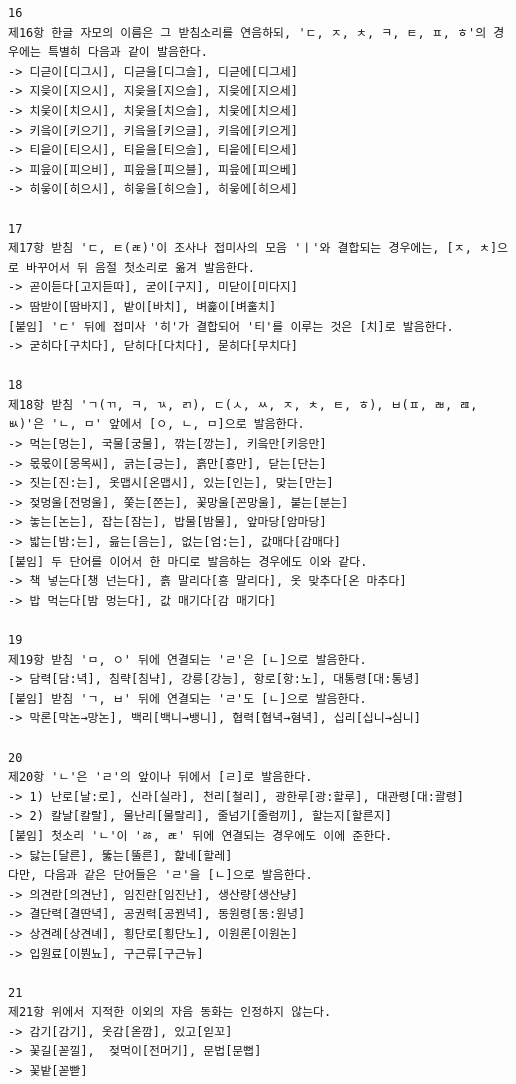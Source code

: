 \documentclass[letterpaper]{article} %
\begin{document}
\begin{verbatim}
16
제16항 한글 자모의 이름은 그 받침소리를 연음하되, 'ㄷ, ㅈ, ㅊ, ㅋ, ㅌ, ㅍ, ㅎ'의 경우에는 특별히 다음과 같이 발음한다.
-> 디귿이[디그시], 디귿을[디그슬], 디귿에[디그세]
-> 지읒이[지으시], 지읒을[지으슬], 지읒에[지으세]
-> 치읓이[치으시], 치읓을[치으슬], 치읓에[치으세]
-> 키읔이[키으기], 키읔을[키으글], 키읔에[키으게]
-> 티읕이[티으시], 티읕을[티으슬], 티읕에[티으세]
-> 피읖이[피으비], 피읖을[피으블], 피읖에[피으베]
-> 히읗이[히으시], 히읗을[히으슬], 히읗에[히으세]

17
제17항 받침 'ㄷ, ㅌ(ㄾ)'이 조사나 접미사의 모음 'ㅣ'와 결합되는 경우에는, [ㅈ, ㅊ]으로 바꾸어서 뒤 음절 첫소리로 옮겨 발음한다.
-> 곧이듣다[고지듣따], 굳이[구지], 미닫이[미다지]
-> 땀받이[땀바지], 밭이[바치], 벼훑이[벼훌치]
[붙임] 'ㄷ' 뒤에 접미사 '히'가 결합되어 '티'를 이루는 것은 [치]로 발음한다.
-> 굳히다[구치다], 닫히다[다치다], 묻히다[무치다]

18
제18항 받침 'ㄱ(ㄲ, ㅋ, ㄳ, ㄺ), ㄷ(ㅅ, ㅆ, ㅈ, ㅊ, ㅌ, ㅎ), ㅂ(ㅍ, ㄼ, ㄿ, ㅄ)'은 'ㄴ, ㅁ' 앞에서 [ㅇ, ㄴ, ㅁ]으로 발음한다.
-> 먹는[멍는], 국물[궁물], 깎는[깡는], 키읔만[키응만]
-> 몫몫이[몽목씨], 긁는[긍는], 흙만[흥만], 닫는[단는]
-> 짓는[진:는], 옷맵시[온맵시], 있는[인는], 맞는[만는]
-> 젖멍울[전멍울], 쫓는[쫀는], 꽃망울[꼰망울], 붙는[분는]
-> 놓는[논는], 잡는[잠는], 밥물[밤물], 앞마당[암마당]
-> 밟는[밤:는], 읊는[음는], 없는[엄:는], 값매다[감매다]
[붙임] 두 단어를 이어서 한 마디로 발음하는 경우에도 이와 같다.
-> 책 넣는다[챙 넌는다], 흙 말리다[흥 말리다], 옷 맞추다[온 마추다]
-> 밥 먹는다[밤 멍는다], 값 매기다[감 매기다]

19
제19항 받침 'ㅁ, ㅇ' 뒤에 연결되는 'ㄹ'은 [ㄴ]으로 발음한다.
-> 담력[담:녁], 침략[침냑], 강릉[강능], 항로[항:노], 대통령[대:통녕]
[붙임] 받침 'ㄱ, ㅂ' 뒤에 연결되는 'ㄹ'도 [ㄴ]으로 발음한다.
-> 막론[막논→망논], 백리[백니→뱅니], 협력[협녁→혐녁], 십리[십니→심니]

20
제20항 'ㄴ'은 'ㄹ'의 앞이나 뒤에서 [ㄹ]로 발음한다.
-> 1) 난로[날:로], 신라[실라], 천리[철리], 광한루[광:할루], 대관령[대:괄령]
-> 2) 칼날[칼랄], 물난리[물랄리], 줄넘기[줄럼끼], 할는지[할른지]
[붙임] 첫소리 'ㄴ'이 'ㅀ, ㄾ' 뒤에 연결되는 경우에도 이에 준한다.
-> 닳는[달른], 뚫는[뚤른], 핥네[할레]
다만, 다음과 같은 단어들은 'ㄹ'을 [ㄴ]으로 발음한다.
-> 의견란[의견난], 임진란[임진난], 생산량[생산냥]
-> 결단력[결딴녁], 공권력[공꿘녁], 동원령[동:원녕]
-> 상견례[상견녜], 횡단로[횡단노], 이원론[이원논]
-> 입원료[이붠뇨], 구근류[구근뉴]

21
제21항 위에서 지적한 이외의 자음 동화는 인정하지 않는다.
-> 감기[감기], 옷감[옫깜], 있고[읻꼬]
-> 꽃길[꼳낄],	젖먹이[전머기], 문법[문뻡]
-> 꽃밭[꼳빧]


\end{verbatim}
\end{document}
